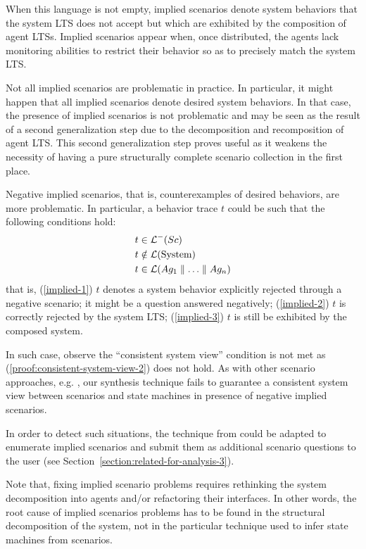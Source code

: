When this language is not empty, implied scenarios denote system behaviors that the system LTS does not accept but which are exhibited by the composition of agent LTSs. Implied scenarios appear when, once distributed, the agents lack monitoring abilities to restrict their behavior so as to precisely match the system LTS.

Not all implied scenarios are problematic in practice. In particular, it might happen that all implied scenarios denote desired system behaviors. In that case, the presence of implied scenarios is not problematic and may be seen as the result of a second generalization step due to the decomposition and recomposition of agent LTS. This second generalization step proves useful as it weakens the necessity of having a pure structurally complete scenario collection in the first place.

Negative implied scenarios, that is, counterexamples of desired behaviors, are more problematic. In particular, a behavior trace $t$ could be such that the following conditions hold:
\begin{align}
&t \in \mathcal{L}^-(Sc)\label{implied-1}\\
&t \notin \mathcal{L}(\mbox{System})\label{implied-2}\\
&t \in \mathcal{L}(Ag_1 \parallel \ldots \parallel Ag_n)\label{implied-3}
\end{align}
that is, (\ref{implied-1}) $t$ denotes a system behavior explicitly rejected through a negative scenario; it might be a question answered negatively; (\ref{implied-2}) $t$ is correctly rejected by the system LTS; (\ref{implied-3}) $t$ is still be exhibited by the composed system.

In such case, observe the ``consistent system view'' condition is not met as (\ref{proof:consistent-system-view-2}) does not hold. As with other scenario approaches, e.g. \cite{Alur:2000, Uchitel:2004}, our synthesis technique fails to guarantee a consistent system view between scenarios and state machines in presence of negative implied scenarios.

In order to detect such situations, the technique from \cite{Uchitel:2004} could be adapted to enumerate implied scenarios and submit them as additional scenario questions to the user (see Section~\ref{section:related-for-analysis-3}). 

Note that, fixing implied scenario problems requires rethinking the system decomposition into agents and/or refactoring their interfaces. In other words, the root cause of implied scenarios problems has to be found in the structural decomposition of the system, not in the particular technique used to infer state machines from scenarios. 

